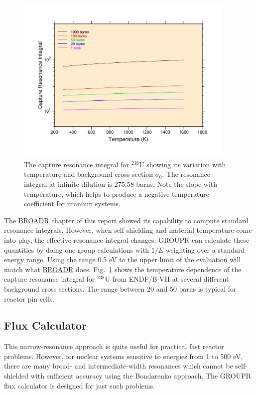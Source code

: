\begin{figure}[bp]\centering
\includegraphics[keepaspectratio, height=3.2in, angle=0]{figs/u238riack}
\caption[$^{238}$U capture resonance integral versus temperature and
 background cross section]{The capture resonance integral for $^{238}$U
 showing its variation with temperature and background cross section
 $\sigma_0$.  The resonance integral at infinite dilution is 275.58 barns.  Note
 the slope with temperature, which helps to produce a negative temperature
 coefficient for uranium systems.}
\label{u238ri}
\end{figure}

The \hyperlink{sBROADRhy}{BROADR} chapter of this report
showed its capability to
compute standard resonance integrals.  However, when self shielding
and material temperature come into play, the effective resonance
integral changes.  GROUPR can calculate these quantities by doing
one-group calculations with $1/E$ weighting over a standard energy
range. Using the range 0.5 eV to the upper limit of the evaluation
will match what \hyperlink{sBROADRhy}{BROADR} does.  Fig.~\ref{u238ri}
shows the temperature
dependence of the capture resonance integral for $^{238}$U from
ENDF/B-VII at several different background cross sections.  The range between
20 and 50 barns is typical for reactor pin cells.


\subsection{Flux Calculator}
\label{ssGROUPR_FluxCalc}

This narrow-resonance approach is quite useful for practical fast
reactor problems.  However, for nuclear systems sensitive to energies
from 1 to 500 eV, there are many broad- and intermediate-width resonances
which cannot be self-shielded with sufficient accuracy using the
Bondarenko approach.  The GROUPR flux calculator
is designed for just such problems.

